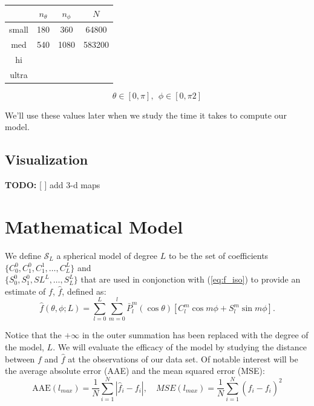 \documentclass[a4paper]{article}
\theoremstyle{definition}
\begin{document}
    \begin{center}
    \begin{tabular}{ c |  c  c  c }
        & $n_\theta$ & $n_\phi$ & $N$ \\ 
    \hline
    small & 180 & 360 & 64800\\
    med & 540 & 1080 & 583200\\
    hi \\
    ultra
    \end{tabular}
    \end{center}
$$\theta \in [0, \pi],\ \ \phi \in [0, \pi2]$$

We'll use these values later when we study the time it takes to compute our model.

\subsection{Visualization}

\textbf{TODO:} [ ] add 3-d maps

\section{Mathematical Model}

We define $\mathcal{S}_L$ a spherical model of degree $L$ to be the set of coefficients $\{C_0^0, C_1^0, C_1^1, \dots, C_L^L\}$ and \\ 
$\{S_0^0, S_1^0, SL^L, \dots, S_L^L\}$ that are used in conjonction with (\ref{eq:f_iso}) to provide an estimate of $f$, $\hat f$, defined as:
\begin{equation}
    \hat f(\theta, \phi; L) = \sum_{l = 0}^{L}\sum_{m = 0}^l \bar P_l^m(\cos\theta)[C_l^m\cos m\phi + S_l^m \sin m \phi].
\end{equation}

Notice that the $+\infty$ in the outer summation has been replaced with the degree of the model, $L$. We will evaluate the efficacy of the model by studying the distance between $f$ and $\hat f$
at the observations of our data set. Of notable interest will be the average absolute error (AAE) and the mean squared error (MSE):
\begin{equation}
    \label{eq:AAE}
    \mathrm{AAE}(l_{max}) = \frac{1}{N}\sum_{i = 1}^{N} |\hat f_i - f_i |, \quad MSE(l_{max}) = \frac{1}{N} \sum_{i = 1}^N (\hat f_i - f_i)^2
\end{equation}
\end{document}
